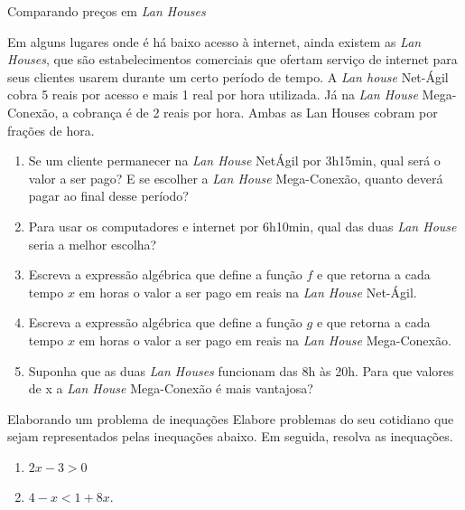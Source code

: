 \begin{task}{Comparando preços em \emph{Lan Houses}}

Em alguns lugares onde é há baixo acesso à internet, ainda existem as \emph{Lan Houses}, que são estabelecimentos comerciais que ofertam serviço de internet para seus clientes usarem durante um certo período de tempo. A \emph{Lan house} Net-Ágil cobra 5 reais por acesso e mais 1 real por hora utilizada. Já na \emph{Lan House} Mega-Conexão, a cobrança é de 2 reais por hora. Ambas as Lan Houses cobram por frações de hora.

\begin{enumerate}
\item{}	
Se um cliente permanecer na \emph{Lan House} NetÁgil por 3h15min, qual será o valor a ser pago? E se escolher a \emph{Lan House} Mega-Conexão, quanto deverá pagar ao final desse período?

\item{}
Para usar os computadores e internet por 6h10min, qual das duas \emph{Lan House} seria a melhor escolha?

\item{}
Escreva a expressão algébrica que define a função $f$ e que retorna a cada tempo $x$ em horas o valor a ser pago em reais na \emph{Lan House} Net-Ágil.

\item{}	
Escreva a expressão algébrica que define a função $g$ e que retorna a cada tempo $x$ em horas o valor a ser pago em reais na \emph{Lan House} Mega-Conexão.

\item{}	
Suponha que as duas \emph{Lan Houses} funcionam das 8h às 20h. Para que valores de x a \emph{Lan House} Mega-Conexão é mais vantajosa?
\end{enumerate}

\end{task}

\begin{task}{Elaborando um problema de inequações}
Elabore problemas do seu cotidiano que sejam representados pelas inequações abaixo. Em seguida, resolva as inequações.
\begin{enumerate}
\item{}
$2x - 3 > 0$

\item{}
$4  - x < 1 + 8x$.
\end{enumerate}

\end{task}

